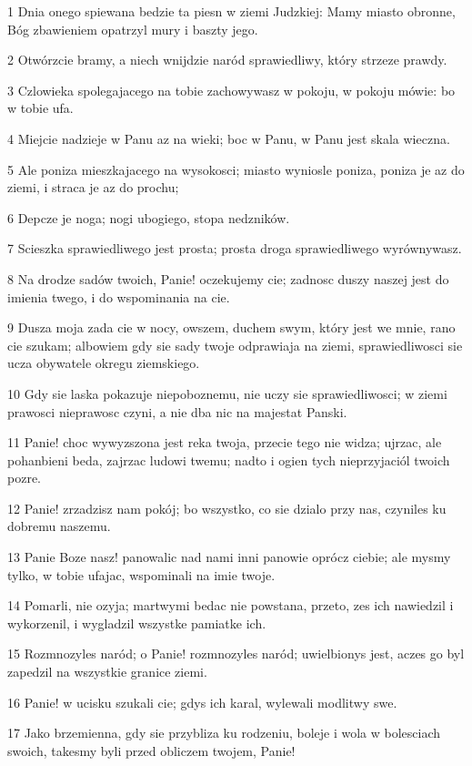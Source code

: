 \par 1 Dnia onego spiewana bedzie ta piesn w ziemi Judzkiej: Mamy miasto obronne, Bóg zbawieniem opatrzyl mury i baszty jego.
\par 2 Otwórzcie bramy, a niech wnijdzie naród sprawiedliwy, który strzeze prawdy.
\par 3 Czlowieka spolegajacego na tobie zachowywasz w pokoju, w pokoju mówie: bo w tobie ufa.
\par 4 Miejcie nadzieje w Panu az na wieki; boc w Panu, w Panu jest skala wieczna.
\par 5 Ale poniza mieszkajacego na wysokosci; miasto wyniosle poniza, poniza je az do ziemi, i straca je az do prochu;
\par 6 Depcze je noga; nogi ubogiego, stopa nedzników.
\par 7 Scieszka sprawiedliwego jest prosta; prosta droga sprawiedliwego wyrównywasz.
\par 8 Na drodze sadów twoich, Panie! oczekujemy cie; zadnosc duszy naszej jest do imienia twego, i do wspominania na cie.
\par 9 Dusza moja zada cie w nocy, owszem, duchem swym, który jest we mnie, rano cie szukam; albowiem gdy sie sady twoje odprawiaja na ziemi, sprawiedliwosci sie ucza obywatele okregu ziemskiego.
\par 10 Gdy sie laska pokazuje niepoboznemu, nie uczy sie sprawiedliwosci; w ziemi prawosci nieprawosc czyni, a nie dba nic na majestat Panski.
\par 11 Panie! choc wywyzszona jest reka twoja, przecie tego nie widza; ujrzac, ale pohanbieni beda, zajrzac ludowi twemu; nadto i ogien tych nieprzyjaciól twoich pozre.
\par 12 Panie! zrzadzisz nam pokój; bo wszystko, co sie dzialo przy nas, czyniles ku dobremu naszemu.
\par 13 Panie Boze nasz! panowalic nad nami inni panowie oprócz ciebie; ale mysmy tylko, w tobie ufajac, wspominali na imie twoje.
\par 14 Pomarli, nie ozyja; martwymi bedac nie powstana, przeto, zes ich nawiedzil i wykorzenil, i wygladzil wszystke pamiatke ich.
\par 15 Rozmnozyles naród; o Panie! rozmnozyles naród; uwielbionys jest, aczes go byl zapedzil na wszystkie granice ziemi.
\par 16 Panie! w ucisku szukali cie; gdys ich karal, wylewali modlitwy swe.
\par 17 Jako brzemienna, gdy sie przybliza ku rodzeniu, boleje i wola w bolesciach swoich, takesmy byli przed obliczem twojem, Panie!
